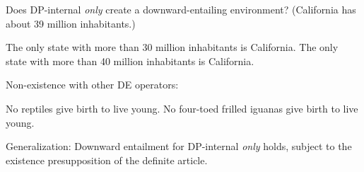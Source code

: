 \documentclass{article}
\begin{document}
\noindent Does DP-internal \textit{only} create a downward-entailing environment? (California has about 39 million inhabitants.)

\begin{exe}
	\ex The only state with more than 30 million inhabitants is California.
	\ex The only state with more than 40 million inhabitants is California.
\end{exe}

\noindent Non-existence with other DE operators:

\begin{exe}
	\ex No reptiles give birth to live young.
	\ex No four-toed frilled iguanas give birth to live young.
\end{exe}

\noindent Generalization: Downward entailment for DP-internal \textit{only} holds, subject to the existence presupposition of the definite article.


\end{document}
